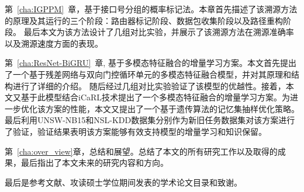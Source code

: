 第~\ref{cha:IGPPM}~章，基于接口号分组的概率标记法。本章首先描述了该溯源方法的原理及其运行的三个阶段：路由器标记阶段、数据包收集阶段以及路径重构阶段。
最后本文为该方法设计了几组对比实验，并展示了该溯源方法在溯源准确率以及溯源速度方面的表现。


第~\ref{cha:ResNet-BiGRU}~章, 基于多模态特征融合的增量学习方案。本文首先提出了一个基于残差网络与双向门控循环单元的多模态特征融合模型，并对其原理和结构进行了详细的介绍。
随后经过几组对比实验验证了该模型的优越性。接着，本文又基于此模型结合iCaRL技术提出了一个多模态特征融合的增量学习方案。为进一步优化该方案的性能，本文又提出了一个基于遗传算法的记忆集抽样优化策略。
最后利用UNSW-NB15和NSL-KDD数据集分别作为新旧任务数据集对该方案进行了验证，验证结果表明该方案能够有效支持模型的增量学习和知识保留。


第~\ref{cha:over_view}章，总结和展望。总结了本文的所有研究工作以及取得的成果，最后指出了本文未来的研究内容和方向。

最后是参考文献、攻读硕士学位期间发表的学术论文目录和致谢。
